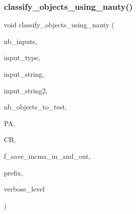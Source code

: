 \subsubsection{\texorpdfstring{classify\+\_\+objects\+\_\+using\+\_\+nauty()}{classify\_objects\_using\_nauty()}}
{\footnotesize\ttfamily void classify\+\_\+objects\+\_\+using\+\_\+nauty (\begin{DoxyParamCaption}\item[{\mbox{\hyperlink{galois_8h_a09fddde158a3a20bd2dcadb609de11dc}{I\+NT}}}]{nb\+\_\+inputs,  }\item[{\mbox{\hyperlink{galois_8h_a09fddde158a3a20bd2dcadb609de11dc}{I\+NT}} $\ast$}]{input\+\_\+type,  }\item[{const \mbox{\hyperlink{galois_8h_ab6cc7b4aeb6ea31aba2b3fbfc83ff5e6}{B\+Y\+TE}} $\ast$$\ast$}]{input\+\_\+string,  }\item[{const \mbox{\hyperlink{galois_8h_ab6cc7b4aeb6ea31aba2b3fbfc83ff5e6}{B\+Y\+TE}} $\ast$$\ast$}]{input\+\_\+string2,  }\item[{\mbox{\hyperlink{galois_8h_a09fddde158a3a20bd2dcadb609de11dc}{I\+NT}}}]{nb\+\_\+objects\+\_\+to\+\_\+test,  }\item[{\mbox{\hyperlink{classprojective__space__with__action}{projective\+\_\+space\+\_\+with\+\_\+action}} $\ast$}]{PA,  }\item[{\mbox{\hyperlink{classclassify__bitvectors}{classify\+\_\+bitvectors}} $\ast$}]{CB,  }\item[{\mbox{\hyperlink{galois_8h_a09fddde158a3a20bd2dcadb609de11dc}{I\+NT}}}]{f\+\_\+save\+\_\+incma\+\_\+in\+\_\+and\+\_\+out,  }\item[{const \mbox{\hyperlink{galois_8h_ab6cc7b4aeb6ea31aba2b3fbfc83ff5e6}{B\+Y\+TE}} $\ast$}]{prefix,  }\item[{\mbox{\hyperlink{galois_8h_a09fddde158a3a20bd2dcadb609de11dc}{I\+NT}}}]{verbose\+\_\+level }\end{DoxyParamCaption})}

\mbox{\label{projective__space__main_8_c_a63c9db9ca280b83f386e3dea5f30fa98}} 
